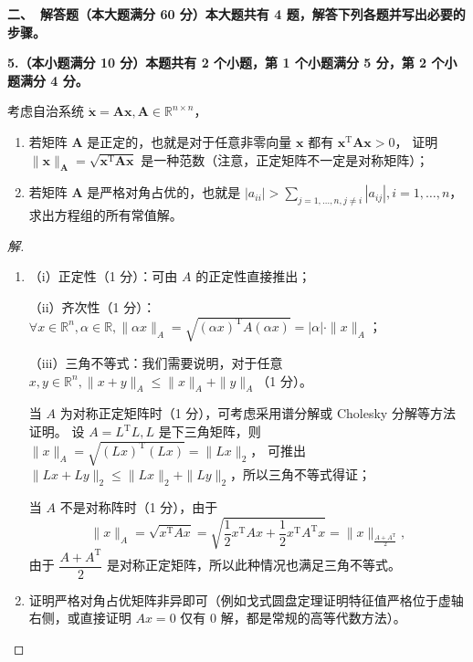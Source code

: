 \textbf{二、\ 解答题（本大题满分 60 分）本大题共有 4 题，解答下列各题并写出必要的步骤。}

\textbf{5.（本小题满分 10 分）本题共有 2 个小题，第 1 个小题满分 5 分，第 2 个小题满分 4 分。}

考虑自治系统 $\dot{\boldsymbol{x}}=\boldsymbol{Ax}, \boldsymbol{A} \in \mathbb{R}^{n \times n}$，
\begin{enumerate}[label=(\arabic*)]
\item 若矩阵 $\boldsymbol{A}$ 是正定的，也就是对于任意非零向量 $\boldsymbol{x}$ 都有 $\boldsymbol{x}^{\mathrm{T}} \boldsymbol{A} \boldsymbol{x}>0$，
证明 $\|\boldsymbol{x}\|_{\boldsymbol{A}}=\sqrt{\boldsymbol{x}^{\mathrm{T}} \boldsymbol{A} \boldsymbol{x}}$ 是一种范数（注意，正定矩阵不一定是对称矩阵）；
\item 若矩阵 $\boldsymbol{A}$ 是严格对角占优的，也就是 $\displaystyle|a_{ii}|>\sum_{j=1, \ldots, n, j \neq i}|a_{ij}|, i=1, \ldots, n$，求出方程组的所有常值解。
\end{enumerate}
\begin{proof}[解]
\begin{enumerate}[label=(\arabic*)]
\item（i）正定性（1 分）：可由 $A$ 的正定性直接推出；

（ii）齐次性（1 分）：$\forall x \in \mathbb{R}^{n}, \alpha \in \mathbb{R},\|\alpha x\|_{A}=\sqrt{(\alpha x)^{\mathrm{T}} A(\alpha x)}=|\alpha|\cdot\|x\|_{A}$；

（iii）三角不等式：我们需要说明，对于任意 $x, y \in \mathbb{R}^{n},\|x+y\|_{A} \leq\|x\|_{A}+\|y\|_{A}$（1 分）。

当 $A$ 为对称正定矩阵时（1 分），可考虑采用谱分解或 Cholesky 分解等方法证明。
设 $A=L^{\mathrm{T}} L, L$ 是下三角矩阵，则 $\|x\|_{A}=\sqrt{(Lx)^{\mathrm{T}}(Lx)}=\|Lx\|_{2}$，
可推出 $\|Lx+Ly\|_{2} \leq \|Lx\|_{2}+\|Ly\|_{2}$，所以三角不等式得证；

当 $A$ 不是对称阵时（1 分），由于
\[\|x\|_{A}=\sqrt{x^{\mathrm{T}}Ax}
=\sqrt{\frac{1}{2}x^{\mathrm{T}}Ax+\frac{1}{2}x^{\mathrm{T}}A^{\mathrm{T}}x}
=\|x\|_{\frac{A+A^{\mathrm{T}}}{2}},\]
由于 $\dfrac{A+A^{\mathrm{T}}}{2}$ 是对称正定矩阵，所以此种情况也满足三角不等式。

\item 证明严格对角占优矩阵非异即可（例如戈式圆盘定理证明特征值严格位于虚轴右侧，或直接证明 $Ax=0$ 仅有 $0$ 解，都是常规的高等代数方法）。\qedhere
\end{enumerate}
\end{proof}


